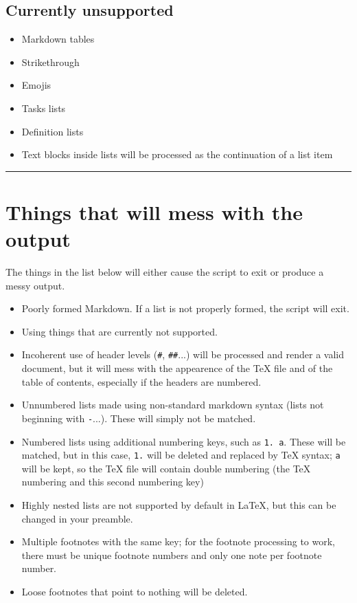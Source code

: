 \documentclass[a4paper, 12pt, twoside]{book}
\begin{document}
\subsection*{Currently unsupported}

\begin{itemize}
\item Markdown tables
\item Strikethrough
\item Emojis
\item Tasks lists
\item Definition lists
\item Text blocks inside lists will be processed as the continuation of a list item 
\end{itemize}

\par\noindent\rule{\linewidth}{0.4pt}
\section*{Things that will mess with the output}

The things in the list below will either cause the script to exit or produce a messy output.

\begin{itemize}
\item Poorly formed Markdown. If a list is not properly formed, the script will exit.
\item Using things that are currently not supported.
\item Incoherent use of header levels (\texttt{\#}, \texttt{\#\#}...) will be processed and render a valid document, but it will mess with the appearence of the TeX file and of the table of contents, especially if the headers are numbered.
\item Unnumbered lists made using non-standard markdown syntax (lists not beginning with \texttt{-}...). These will simply not be matched.
\item Numbered lists using additional numbering keys, such as \texttt{1. a}. These will be matched, but in this case, \texttt{1.} will be deleted and replaced by TeX syntax; \texttt{a} will be kept, so the TeX file will contain double numbering (the TeX numbering and this second numbering key)
\item Highly nested lists are not supported by default in LaTeX, but this can be changed in your preamble.
\item Multiple footnotes with the same key; for the footnote processing to work, there must be unique footnote numbers and only one note per footnote number.
\item Loose footnotes that point to nothing will be deleted. 
\end{itemize}
\end{document}
